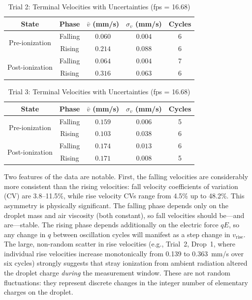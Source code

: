 \documentclass[11pt]{article}
\begin{document}
\begin{table}[h!]
    \centering
    \caption{Trial 2: Terminal Velocities with Uncertainties (fps = 16.68)}
    \vspace{0.1in}
    \begin{tabular}{|c|c|c|c|c|}
    \hline
    \textbf{State} & \textbf{Phase} & \textbf{$\bar{v}$ (mm/s)} & $\sigma_v$ (mm/s) & \textbf{Cycles} \\
    \hline
    \multirow{2}{*}{Pre-ionization} & Falling & $0.060$ & $0.004$ & 6 \\
    & Rising & $0.214$ & $0.088$ & 6 \\
    \hline
    \multirow{2}{*}{Post-ionization} & Falling & $0.064$ & $0.004$ & 7 \\
    & Rising & $0.316$ & $0.063$ & 6 \\
    \hline
    \end{tabular}
\end{table}

\begin{table}[h!]
    \centering
    \caption{Trial 3: Terminal Velocities with Uncertainties (fps = 16.68)}
    \vspace{0.1in}
    \begin{tabular}{|c|c|c|c|c|}
    \hline
    \textbf{State} & \textbf{Phase} & \textbf{$\bar{v}$ (mm/s)} & $\sigma_v$ (mm/s) & \textbf{Cycles} \\
    \hline
    \multirow{2}{*}{Pre-ionization} & Falling & $0.159$ & $0.006$ & 5 \\
    & Rising & $0.103$ & $0.038$ & 6 \\
    \hline
    \multirow{2}{*}{Post-ionization} & Falling & $0.174$ & $0.013$ & 6 \\
    & Rising & $0.171$ & $0.008$ & 5 \\
    \hline
    \end{tabular}
\end{table}

Two features of the data are notable. First, the falling velocities are considerably more consistent than the rising velocities: fall velocity coefficients of variation (CV) are 3.8--11.5\%, while rise velocity CVs range from 4.5\% up to 48.2\%. This asymmetry is physically significant. The falling phase depends only on the droplet mass and air viscosity (both constant), so fall velocities should be---and are---stable. The rising phase depends additionally on the electric force $qE$, so any change in $q$ between oscillation cycles will manifest as a step change in $v_{\text{rise}}$. The large, non-random scatter in rise velocities (e.g., Trial~2, Drop~1, where individual rise velocities increase monotonically from 0.139 to 0.363~mm/s over six cycles) strongly suggests that stray ionization from ambient radiation altered the droplet charge \emph{during} the measurement window. These are not random fluctuations: they represent discrete changes in the integer number of elementary charges on the droplet.
\end{document}
